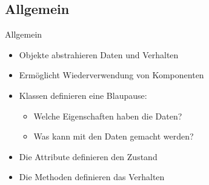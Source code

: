\subsection{Allgemein}
\begin{frame}{Allgemein}
   \begin{itemize}[<+(1)->]
      \itemsep14pt
      \item Objekte abstrahieren Daten und Verhalten
      \item Ermöglicht Wiederverwendung von Komponenten
      \item Klassen definieren eine Blaupause: \begin{itemize}
         \item Welche Eigenschaften haben die Daten? \hfill {}
         \item Was kann mit den Daten gemacht werden? \hfill {}
      \end{itemize}
      \item Die Attribute definieren den Zustand
      \item Die Methoden definieren das Verhalten
   \end{itemize}
\end{frame}
\SidebarReset

\def\Card#1#2{\begin{tikzpicture}
   \node (udbert) at(0,0) {\bjava{Penguin #1}};
   \node[below right,inner sep=0pt,xshift=4pt,align=left,draw,rounded corners=1pt] at (udbert.south west) {\begin{tabular}{l|p{4em}}
      #2
   \end{tabular}};
\end{tikzpicture}}

